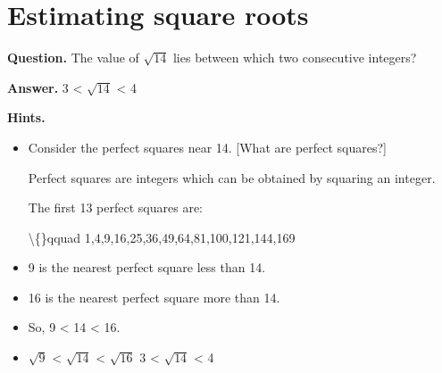 \documentclass{article}
\begin{document}
\section*{Estimating square roots}
\textbf{Question.} The value of $\sqrt{14}$ lies between which two consecutive integers?

\textbf{Answer.} 3 < $\sqrt{14}$ < 4

\textbf{Hints.}
\begin{itemize}
  \item Consider the perfect squares near 14.
                            [What are perfect squares?]
                        
                        
                            
                                Perfect squares are integers which can be obtained by squaring an integer.
                            
                            
                                The first 13 perfect squares are:
                            
                            \textbackslash\{\}qquad 1,4,9,16,25,36,49,64,81,100,121,144,169
  \item 9 is the nearest perfect square less than 14.
  \item 16 is the nearest perfect square more than 14.
  \item So, 9 < 14 < 16.
  \item $\sqrt{9}$ < $\sqrt{14}$ < $\sqrt{16}$
                        3 < $\sqrt{14}$ < 4
\end{itemize}
\end{document}
